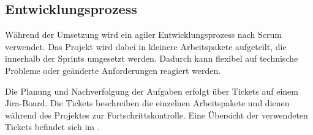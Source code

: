 \subsection{Entwicklungsprozess}
\label{sec:Entwicklungsprozess}
Während der Umsetzung wird ein agiler Entwicklungsprozess nach Scrum verwendet.
Das Projekt wird dabei in kleinere Arbeitspakete aufgeteilt, die innerhalb der Sprints umgesetzt werden.
Dadurch kann flexibel auf technische Probleme oder geänderte Anforderungen reagiert werden.
\par\smallskip
Die Planung und Nachverfolgung der Aufgaben erfolgt über Tickets auf einem Jira-Board.
Die Tickets beschreiben die einzelnen Arbeitspakete und dienen während des Projektes zur Fortschrittskontrolle.
Eine Übersicht der verwendeten Tickets befindet sich im .